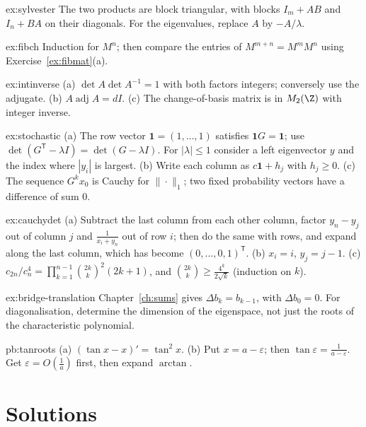 \begin{hint}{ex:sylvester}
The two products are block triangular, with blocks $I_m+AB$ and $I_n+BA$ on their diagonals. For the eigenvalues, replace $A$ by $-A/\lambda$.
\end{hint}
\begin{hint}{ex:fibch}
Induction for $M^n$; then compare the entries of $M^{m+n}=M^mM^n$ using Exercise~\ref{ex:fibmat}(a).
\end{hint}
\begin{hint}{ex:intinverse}
(a) $\det A\det A^{-1}=1$ with both factors integers; conversely use the adjugate. (b) $A\operatorname{adj}A=dI$. (c) The change-of-basis matrix is in $M_2(\Z)$ with integer inverse.
\end{hint}
\begin{hint}{ex:stochastic}
(a) The row vector $\mathbf 1=(1,\dots,1)$ satisfies $\mathbf 1G=\mathbf 1$; use $\det(G^{\mathsf T}-\lambda I)=\det(G-\lambda I)$. For $|\lambda|\le1$ consider a left eigenvector $y$ and the index where $|y_i|$ is largest. (b) Write each column as $c\mathbf 1+h_j$ with $h_j\ge0$. (c) The sequence $G^kx_0$ is Cauchy for $\|\cdot\|_1$; two fixed probability vectors have a difference of sum $0$.
\end{hint}
\begin{hint}{ex:cauchydet}
(a) Subtract the last column from each other column, factor $y_n-y_j$ out of column $j$ and $\frac1{x_i+y_n}$ out of row $i$; then do the same with rows, and expand along the last column, which has become $(0,\dots,0,1)^{\mathsf T}$. (b) $x_i=i$, $y_j=j-1$. (c) $c_{2n}/c_n^4=\prod_{k=1}^{n-1}\binom{2k}k^2(2k+1)$, and $\binom{2k}k\ge\frac{4^k}{2\sqrt k}$ (induction on $k$).
\end{hint}

\begin{hint}{ex:bridge-translation}
Chapter~\ref{ch:sums} gives $\Delta b_k=b_{k-1}$, with $\Delta b_0=0$. For diagonalisation, determine the dimension of the eigenspace, not just the roots of the characteristic polynomial.
\end{hint}

\begin{hint}{pb:tanroots}
(a) $(\tan x-x)'=\tan^2x$. (b) Put $x=a-\varepsilon$; then $\tan\varepsilon=\frac1{a-\varepsilon}$. Get $\varepsilon=O(\frac1a)$ first, then expand $\arctan$.
\end{hint}

\section{Solutions}

